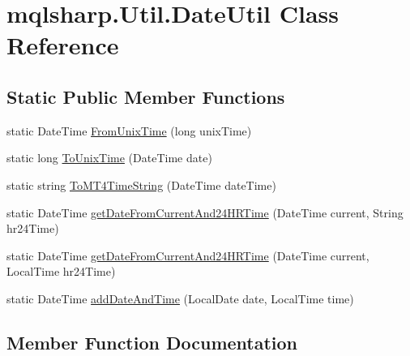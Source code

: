 \hypertarget{classmqlsharp_1_1_util_1_1_date_util}{}\section{mqlsharp.\+Util.\+Date\+Util Class Reference}
\label{classmqlsharp_1_1_util_1_1_date_util}
\subsection*{Static Public Member Functions}
\begin{DoxyCompactItemize}
\item 
static Date\+Time \hyperlink{classmqlsharp_1_1_util_1_1_date_util_ac5c83b6461b83a6fbad4f8dc2b41c827}{From\+Unix\+Time} (long unix\+Time)
\item 
static long \hyperlink{classmqlsharp_1_1_util_1_1_date_util_a416835f72ab2b32d38b27aabcb6ea4f7}{To\+Unix\+Time} (Date\+Time date)
\item 
static string \hyperlink{classmqlsharp_1_1_util_1_1_date_util_a7793534a8fac2e527ded964b2a49bfbb}{To\+M\+T4\+Time\+String} (Date\+Time date\+Time)
\item 
static Date\+Time \hyperlink{classmqlsharp_1_1_util_1_1_date_util_a16c91ee5a8a50fde8ffc181526f39a9b}{get\+Date\+From\+Current\+And24\+H\+R\+Time} (Date\+Time current, String hr24\+Time)
\item 
static Date\+Time \hyperlink{classmqlsharp_1_1_util_1_1_date_util_a652e0b825a888e8962ededc97071748f}{get\+Date\+From\+Current\+And24\+H\+R\+Time} (Date\+Time current, Local\+Time hr24\+Time)
\item 
static Date\+Time \hyperlink{classmqlsharp_1_1_util_1_1_date_util_aaca50fabe84830033501487c81502f94}{add\+Date\+And\+Time} (Local\+Date date, Local\+Time time)
\end{DoxyCompactItemize}


\subsection{Member Function Documentation}
